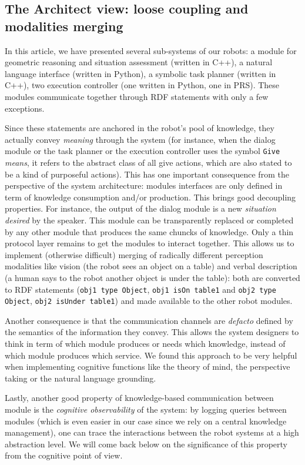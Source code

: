 \documentclass[letterpaper, 10 pt, conference]{ieeeconf}  %
\begin{document}
\subsection{The Architect view: loose coupling and modalities merging}

In this article, we have presented several sub-systems of our robots: a module for geometric
reasoning and situation assessment (written in C++), a natural
language interface (written in Python), a symbolic task planner (written in
C++), two execution controller (one written in Python, one in PRS). These
modules communicate together through RDF statements with only a few exceptions.

Since these statements are anchored in the robot's pool of knowledge, they
actually convey \emph{meaning} through the system (for instance, when the
dialog module or the task planner or the execution controller uses the symbol
{\tt Give} \emph{means}, it refers to the abstract class of all give actions, which are also stated
to be a kind of purposeful actions). This has one important consequence from
the perspective of the system architecture: modules interfaces are only defined
in term of knowledge consumption and/or production. This brings good decoupling
properties. For instance, the output of the dialog module is a new
\emph{situation desired} by the speaker. This module can be transparently
replaced or completed by any other module that produces the same chuncks of
knowledge. Only a thin protocol layer remains to get the modules to interact
together. This allows us to implement (otherwise difficult) merging of
radically different perception modalities like vision (the robot sees an object on
a table) and verbal description (a human says to the robot another object is
under the table): both are converted to RDF statements ({\tt obj1 type Object},
{\tt obj1 isOn table1} and {\tt obj2 type Object}, {\tt obj2 isUnder table1})
and made available to the other robot modules.

Another consequence is that the communication channels are {\it
defacto} defined by the semantics of the information they
convey. This allows the system designers to think in term of which module
produces or needs which knowledge, instead of which module produces which
service. We found this approach to be very helpful when implementing cognitive
functions like the theory of mind, the perspective taking or the natural
language grounding.

Lastly, another good property of knowledge-based communication between module
is the \emph{cognitive observability} of the system: by logging queries between
modules (which is even easier in our case since we rely on a central knowledge
management), one can trace the interactions between the robot systems at a high
abstraction level. We will come back below on the significance of this property
from the cognitive point of view.
\end{document}
